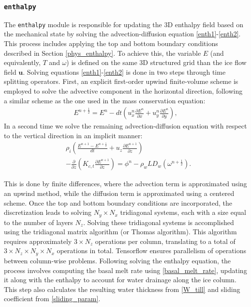 \documentclass[10pt,twocolumn]{article}
\begin{document}
\subsubsection{\texttt{enthalpy}}
\label{module_enthalpy}

The \texttt{enthalpy} module is responsible for updating the 3D enthalpy field based 
on the mechanical state by solving the advection-diffusion equation \eqref{enth1}-\eqref{enth2}. 
This process includes applying the top and bottom boundary conditions described in Section
\ref{phys_enthalpy}.
To achieve this, the variable $E$ (and equivalently, $T$ and $\omega$) is defined 
on the same 3D structured grid than the ice flow field $\mathbf{u}$. 
Solving equations \eqref{enth1}-\eqref{enth2} is done in two steps through time splitting operators.
First, an explicit first-order upwind finite-volume scheme is employed to solve the 
advective component in the horizontal direction, following a similar scheme as the one 
used in the mass conservation equation:
\begin{align}
 E^{n+\frac12}  = E^n - dt \left( u^n_x \frac{\partial E^n}{ \partial x} 
  + u^n_y \frac{\partial E^n}{ \partial y} \right),
\label{E_step1}
\end{align}
In a second time we solve the remaining advection-diffusion equation with respect to the 
vertical direction in an implicit manner:
\begin{align}
& \rho_i \left( \frac{E^{n+1}-E^{n+\frac12}}{ dt}
+ u_z \frac{\partial E^{n+1}}{ \partial z} \right) \\
& - \frac{\partial }{\partial z} \left(
K_{c,t} \frac{\partial E^{n+1}}{ \partial z} \right) 
 = \phi^n - \rho_w L D_w(\omega^{n+\frac12}).
\label{E_step2}
\end{align}

This is done by finite differences, where the advection term is approximated using 
an upwind method, while the diffusion term is approximated using a centered scheme. 
Once the top and bottom boundary conditions are incorporated, the discretization leads 
to solving $N_y \times N_x$ tridiagonal systems, each with 
a size equal to the number of layers $N_z$. Solving these tridiagonal 
systems is accomplished using the tridiagonal matrix algorithm (or Thomas algorithm). 
This algorithm requires approximately $3 \times N_z$ operations per column, 
translating to a total of $3 \times N_z \times N_y \times N_x$ operations in total.
Tensorflow ensures  parallelism of operations between column-wise problems. 
Following solving the enthalpy equation, the process involves computing the basal 
melt rate using \eqref{basal_melt_rate}, updating it along with the enthalpy to account 
for water drainage along the ice column.
This step also calculates the resulting water thickness from \eqref{W_till} and 
sliding coefficient from \eqref{sliding_param}.
\end{document}
